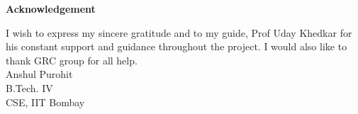 \begin{center}
{\large \bfseries
Acknowledgement
}~\\[1cm]
\end{center}
\begin{flushleft}
{
I wish to express my sincere gratitude and to my guide, Prof Uday Khedkar for his constant support and guidance throughout the project. I would also like to thank GRC group for all help.
}~\\[1.5cm]
{
Anshul Purohit\\
B.Tech. IV\\
CSE, IIT Bombay
}
\end{flushleft}

